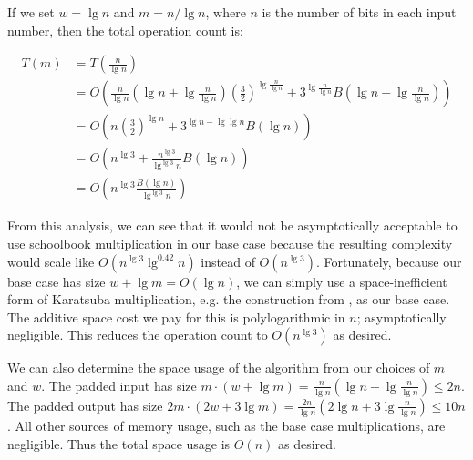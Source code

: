 \documentclass[onecolumn,unpublished]{quantumarticle}
\begin{document}
If we set $w=\lg n$ and $m=n/\lg n$, where $n$ is the number of bits in each input number, then the total operation count is:

\begin{equation}
    \begin{aligned}
T(m) &= T\left(\frac{n}{\lg n}\right)
\\   &= O\left(\frac{n}{\lg n} \left(\lg n + \lg \frac{n}{\lg n}\right) \left(\frac{3}{2}\right)^{\lg \frac{n}{\lg n}} + 3^{\lg \frac{n}{\lg n}} B\left(\lg n + \lg \frac{n}{\lg n}\right)\right)
\\   &= O\left(n \left(\frac{3}{2}\right)^{\lg n} + 3^{\lg n - \lg \lg n} B(\lg n)\right)
\\   &= O\left(n^{\lg 3} + \frac{n^{\lg 3}}{\lg^{\lg 3} n} B(\lg n)\right)
\\   &= O\left(n^{\lg 3} \frac{B(\lg n)}{\lg^{\lg 3} n}\right)
    \end{aligned}
\end{equation}

From this analysis, we can see that it would not be asymptotically acceptable to use schoolbook multiplication in our base case because the resulting complexity would scale like $O(n^{\lg 3} \lg^{0.42} n)$ instead of $O(n^{\lg 3})$.
Fortunately, because our base case has size $w + \lg m = O(\lg n)$, we can simply use a space-inefficient form of Karatsuba multiplication, e.g. the construction from \cite{parent2017karatsuba}, as our base case.
The additive space cost we pay for this is polylogarithmic in $n$; asymptotically negligible.
This reduces the operation count to $O(n^{\lg 3})$ as desired.

We can also determine the space usage of the algorithm from our choices of $m$ and $w$.
The padded input has size $m \cdot (w + \lg m) = \frac{n}{\lg n} (\lg n + \lg \frac{n}{\lg n}) \leq 2 n$.
The padded output has size $2m \cdot (2w + 3 \lg m) = \frac{2n}{\lg n} (2 \lg n + 3 \lg \frac{n}{\lg n}) \leq 10 n$.
All other sources of memory usage, such as the base case multiplications, are negligible.
Thus the total space usage is $O(n)$ as desired.
\end{document}
